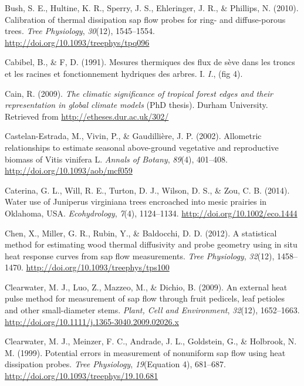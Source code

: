 \documentclass[11pt,twoside]{reedthesis}
\begin{document}
\hypertarget{ref-Bush2010}{}
Bush, S. E., Hultine, K. R., Sperry, J. S., Ehleringer, J. R., \&
Phillips, N. (2010). Calibration of thermal dissipation sap flow probes
for ring- and diffuse-porous trees. \emph{Tree Physiology},
\emph{30}(12), 1545--1554. \url{http://doi.org/10.1093/treephys/tpq096}

\hypertarget{ref-Cabibel1991}{}
Cabibel, B., \& F, D. (1991). Mesures thermiques des flux de sève dans
les troncs et les racines et fonctionnement hydriques des arbres. I.
\emph{I.}, (fig 4).

\hypertarget{ref-Cain2009}{}
Cain, R. (2009). \emph{The climatic significance of tropical forest
edges and their representation in global climate models} (PhD thesis).
Durham University. Retrieved from \url{http://etheses.dur.ac.uk/302/}

\hypertarget{ref-Castelan-Estrada2002}{}
Castelan-Estrada, M., Vivin, P., \& Gaudillière, J. P. (2002).
Allometric relationships to estimate seasonal above-ground vegetative
and reproductive biomass of Vitis vinifera L. \emph{Annals of Botany},
\emph{89}(4), 401--408. \url{http://doi.org/10.1093/aob/mcf059}

\hypertarget{ref-Caterina2014}{}
Caterina, G. L., Will, R. E., Turton, D. J., Wilson, D. S., \& Zou, C.
B. (2014). Water use of Juniperus virginiana trees encroached into mesic
prairies in Oklahoma, USA. \emph{Ecohydrology}, \emph{7}(4), 1124--1134.
\url{http://doi.org/10.1002/eco.1444}

\hypertarget{ref-Chen2012}{}
Chen, X., Miller, G. R., Rubin, Y., \& Baldocchi, D. D. (2012). A
statistical method for estimating wood thermal diffusivity and probe
geometry using in situ heat response curves from sap flow measurements.
\emph{Tree Physiology}, \emph{32}(12), 1458--1470.
\url{http://doi.org/10.1093/treephys/tps100}

\hypertarget{ref-Clearwater2009}{}
Clearwater, M. J., Luo, Z., Mazzeo, M., \& Dichio, B. (2009). An
external heat pulse method for measurement of sap flow through fruit
pedicels, leaf petioles and other small-diameter stems. \emph{Plant,
Cell and Environment}, \emph{32}(12), 1652--1663.
\url{http://doi.org/10.1111/j.1365-3040.2009.02026.x}

\hypertarget{ref-Clearwater1999}{}
Clearwater, M. J., Meinzer, F. C., Andrade, J. L., Goldstein, G., \&
Holbrook, N. M. (1999). Potential errors in measurement of nonuniform
sap flow using heat dissipation probes. \emph{Tree Physiology},
\emph{19}(Equation 4), 681--687.
\url{http://doi.org/10.1093/treephys/19.10.681}
\end{document}
